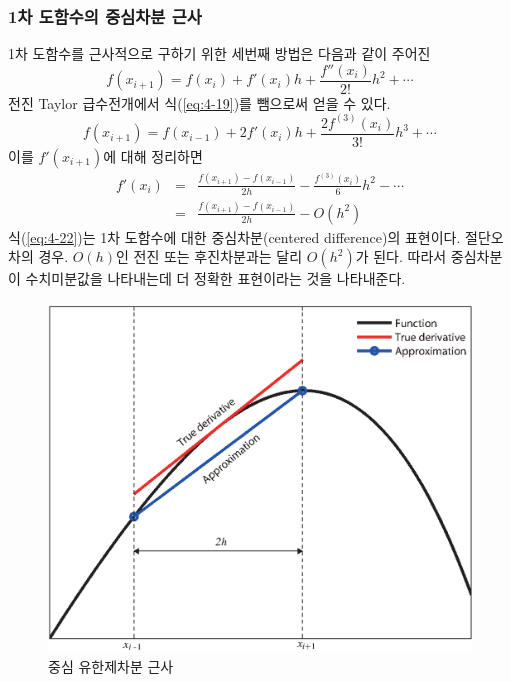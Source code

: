 \subsubsection{1차 도함수의 중심차분 근사}
1차 도함수를 근사적으로 구하기 위한 세번째 방법은 다음과 같이 주어진
\begin{equation}
f(x_{i+1})=f(x_i)+f'(x_i)h+\frac{f''(x_i)}{2!}h^2+\cdots
\label{eq:4-21}
\end{equation}
전진 Taylor 급수전개에서 식(\ref{eq:4-19})를 뺌으로써 얻을 수 있다.
\begin{equation}
f(x_{i+1})=f(x_{i-1})+2f'(x_i)h+\frac{2f^{(3)}(x_i)}{3!}h^3+\cdots
\end{equation}
이를 $f'(x_{i+1})$에 대해 정리하면
\begin{eqnarray}
f'(x_i)&=&\frac{f(x_{i+1})-f(x_{i-1})}{2h}-\frac{f^{(3)}(x_i)}{6}h^2-\cdots\\
&=&\frac{f(x_{i+1})-f(x_{i-1})}{2h}-O(h^2)
\label{eq:4-22}
\end{eqnarray}
식(\ref{eq:4-22})는 1차 도함수에 대한 중심차분(centered difference)의 표현이다. 절단오차의 경우. $O(h)$인 전진 또는 후진차분과는 달리 $O(h^2)$가 된다. 따라서 중심차분이 수치미분값을 나타내는데 더 정확한 표현이라는 것을 나타내준다.
\begin{figure}[!hbpt]
\centering
\includegraphics[keepaspectratio=true,width=0.5\linewidth]{figs/centered-deriv.eps}
\caption{중심 유한제차분 근사}
\label{fig:4-4c}
\end{figure}

\clearpage

